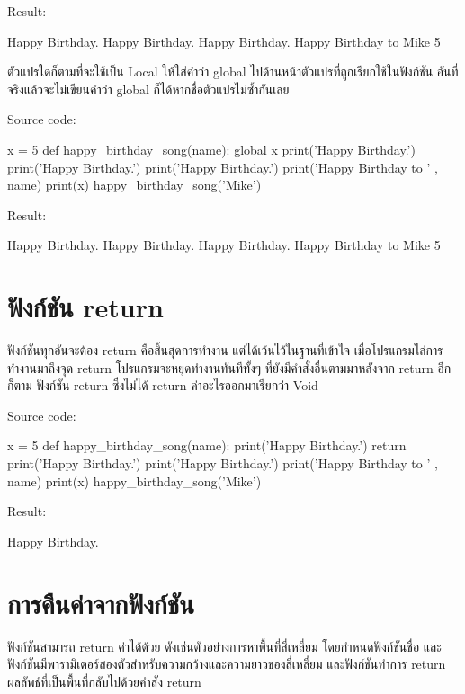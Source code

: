 Result:
\begin{codelist}{}{}
Happy Birthday.
Happy Birthday.
Happy Birthday.
Happy Birthday to Mike
5
\end{codelist}


ตัวแปรใดก็ตามที่จะใช้เป็น Local ให้ใส่คำว่า global ไปด้านหน้าตัวแปรที่ถูกเรียกใช้ในฟังก์ชัน อันที่จริงแล้วจะไม่เขียนคำว่า global ก็ได้หากชื่อตัวแปรไม่ซ้ำกันเลย

Source code:
\begin{codelist}{}{}
x = 5
def happy_birthday_song(name):
    global x
    print('Happy Birthday.')
    print('Happy Birthday.')
    print('Happy Birthday.')
    print('Happy Birthday to ' , name)
    print(x)
happy_birthday_song('Mike')
\end{codelist}

Result:
\begin{codelist}{}{}
Happy Birthday.
Happy Birthday.
Happy Birthday.
Happy Birthday to Mike
5
\end{codelist}

\section{ฟังก์ชัน return}

ฟังก์ชันทุกอันจะต้อง return คือสิ้นสุดการทำงาน แต่ได้เว้นไว้ในฐานที่เข้าใจ เมื่อโปรแกรมไล่การทำงานมาถึงจุด return โปรแกรมจะหยุดทำงานทันทีทั้งๆ ที่ยังมีคำสั่งอื่นตามมาหลังจาก return อีกก็ตาม  ฟังก์ชัน return ซึ่งไม่ได้ return ค่าอะไรออกมาเรียกว่า Void 

Source code:
\begin{codelist}{}{}
x = 5
def happy_birthday_song(name):
    print('Happy Birthday.')
    return
    print('Happy Birthday.')
    print('Happy Birthday.')
    print('Happy Birthday to ' , name)
    print(x)
happy_birthday_song('Mike')
\end{codelist}

Result:
\begin{codelist}{}{}
Happy Birthday.
\end{codelist}

\section{การคืนค่าจากฟังก์ชัน}

ฟังก์ชันสามารถ return ค่าได้ด้วย ดังเช่นตัวอย่างการหาพื้นที่สี่เหลี่ยม โดยกำหนดฟังก์ชันชื่อ   และฟังก์ชันมีพารามิเตอร์สองตัวสำหรับความกว้างและความยาวของสี่เหลี่ยม และฟังก์ชันทำการ return ผลลัพธ์ที่เป็นพื้นที่กลับไปด้วยคำสั่ง return

